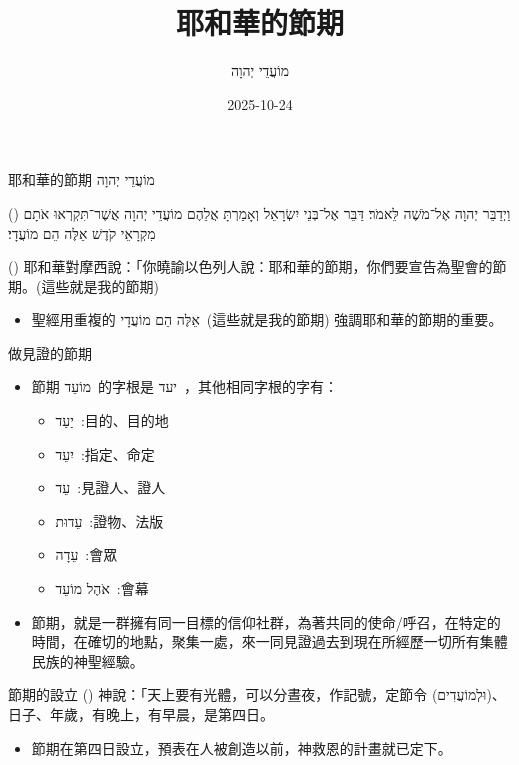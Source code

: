 \documentclass{beamer}
\title{耶和華的節期}
\subtitle{\texthebrew{מוֹעֲדֵי יְהוָה}}
\date{2025-10-24}
\makeatletter
\newcommand{\biblerefhebrew}[1]{\brm@bibleref{hebrew}{#1}}
\newcommand{\parvspace}{\par\vspace{0.5em}}
\makeatother
\begin{document}
\begin{frame}
  \titlepage
\end{frame}

\begin{frame}{耶和華的節期 \texthebrew{מוֹעֲדֵי יְהוָה}}
  \begin{hebrew}
    (\biblerefhebrew{Lv 23:1-2}) וַיְדַבֵּר יְהוָה אֶל־מֹשֶׁה לֵּאמֹר׃ דַּבֵּר אֶל־בְּנֵי יִשְׂרָאֵל וְאָמַרְתָּ אֲלֵהֶם \alert{מוֹעֲדֵי יְהוָה} אֲשֶׁר־תִּקְרְאוּ אֹתָם מִקְרָאֵי קֹדֶשׁ \alert{אֵלֶּה הֵם מוֹעֲדָי}׃
  \end{hebrew}\parvspace
  () 耶和華對摩西說：「你曉諭以色列人說：\alert{耶和華的節期}，你們要宣告為聖會的節期。\alert{(這些就是我的節期)}\parvspace
  \begin{itemize}
    \item 聖經用重複的 \alert{\texthebrew{אֵלֶּה הֵם מוֹעֲדָי}\ (這些就是我的節期)} 強調耶和華的節期的重要\parencite{作見證的節期}。
  \end{itemize}
\end{frame}

\begin{frame}{做見證的節期}
  \begin{itemize}
    \item 節期 \texthebrew{מוֹעֵד}\ 的字根是 \texthebrew{יעד}\ ，其他相同字根的字有\parencite{節期的功能}：
      \begin{itemize}
        \item \texthebrew{יַעַד}\ :目的、目的地
        \item \texthebrew{יִעֵד}\ :指定、命定
        \item \texthebrew{עֵד}\ :見證人、證人
        \item \texthebrew{עֵדוּת}\ :證物、法版
        \item \texthebrew{עֵדָה}\ :會眾
        \item \texthebrew{אֹהֶל מוֹעֵד}\ :會幕
      \end{itemize}
    \item \alert{節期}，就是一群擁有\alert{同一目標}的信仰社群，為著\alert{共同的使命/呼召}，在\alert{特定的時間}，在確切的地點，聚集一處，來\alert{一同見證}過去到現在所經歷一切所有\alert{集體民族}的神聖經驗\parencite{節期的功能}。
  \end{itemize}
\end{frame}

\begin{frame}{節期的設立}
  () 神說：「天上要有光體，可以分晝夜，作記號，\alert{定節令 (\texthebrew{וּלְמוֹעֲדִים})}、日子、年歲，\textellipsis{}有晚上，有早晨，是\alert{第四日}。
  \begin{itemize}
    \item 節期在\alert{第四日}設立，預表在人被創造以前，神救恩的計畫就已定下。
  \end{itemize}
\end{frame}
\end{document}
